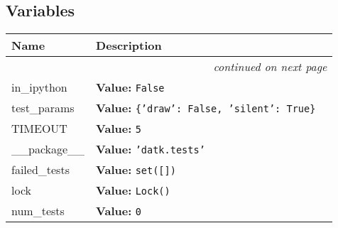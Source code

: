
  \subsection{Variables}

    \vspace{-1cm}
\hspace{\varindent}\begin{longtable}{|p{\varnamewidth}|p{\vardescrwidth}|l}
\cline{1-2}
\cline{1-2} \centering \textbf{Name} & \centering \textbf{Description}& \\
\cline{1-2}
\endhead\cline{1-2}\multicolumn{3}{r}{\small\textit{continued on next page}}\\\endfoot\cline{1-2}
\endlastfoot\raggedright i\-n\-\_\-i\-p\-y\-t\-h\-o\-n\- & \raggedright \textbf{Value:} 
{\tt False}&\\
\cline{1-2}
\raggedright t\-e\-s\-t\-\_\-p\-a\-r\-a\-m\-s\- & \raggedright \textbf{Value:} 
{\tt \texttt{\{}\texttt{'}\texttt{draw}\texttt{'}\texttt{: }False\texttt{, }\texttt{'}\texttt{silent}\texttt{'}\texttt{: }True\texttt{\}}}&\\
\cline{1-2}
\raggedright T\-I\-M\-E\-O\-U\-T\- & \raggedright \textbf{Value:} 
{\tt 5}&\\
\cline{1-2}
\raggedright \_\-\_\-p\-a\-c\-k\-a\-g\-e\-\_\-\_\- & \raggedright \textbf{Value:} 
{\tt \texttt{'}\texttt{datk.tests}\texttt{'}}&\\
\cline{1-2}
\raggedright f\-a\-i\-l\-e\-d\-\_\-t\-e\-s\-t\-s\- & \raggedright \textbf{Value:} 
{\tt \texttt{set([}\texttt{])}}&\\
\cline{1-2}
\raggedright l\-o\-c\-k\- & \raggedright \textbf{Value:} 
{\tt Lock()}&\\
\cline{1-2}
\raggedright n\-u\-m\-\_\-t\-e\-s\-t\-s\- & \raggedright \textbf{Value:} 
{\tt 0}&\\
\cline{1-2}
\end{longtable}

